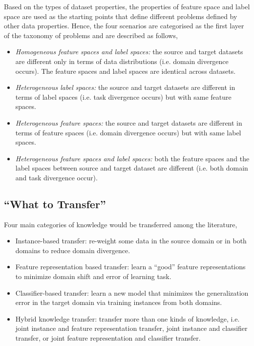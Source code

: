 \documentclass[prodmode]{acmsmall}  %
\begin{document}
Based on the types of dataset properties, the properties of feature space and label space are used as the starting points that define different problems defined by other data properties. Hence, the four scenarios are categorised as the first layer of the taxonomy of problems and are described as follows,
\begin{itemize}
\item \textit{Homogeneous feature spaces and label spaces:} the source and target datasets are different only in terms of data distributions (i.e. domain divergence occurs). The feature spaces and label spaces are identical across datasets.
\item \textit{Heterogeneous label spaces:} the source and target datasets are different in terms of label spaces (i.e. task divergence occurs) but with same feature spaces.
\item \textit{Heterogeneous feature spaces:} the source and target datasets are different in terms of feature spaces (i.e. domain divergence occurs) but with same label spaces. 
\item \textit{Heterogeneous feature spaces and label spaces:} both the feature spaces and the label spaces between source and target dataset are different (i.e. both domain and task divergence occur).
\end{itemize} 

\subsection{``What to Transfer''}
Four main categories of knowledge would be transferred among the literature,
\begin{itemize}
\item Instance-based transfer: re-weight some data in the source domain or in both domains to reduce domain divergence.
\item Feature representation based transfer: learn a ``good'' feature representations to minimize domain shift and error of learning task.
\item Classifier-based transfer: learn a new model that minimizes the generalization error in the target domain via training instances from both domains. 
\item Hybrid knowledge transfer: transfer more than one kinds of knowledge, i.e. joint instance and feature representation transfer, joint instance and classifier transfer, or joint feature representation and classifier transfer.
\end{itemize}
\end{document}
